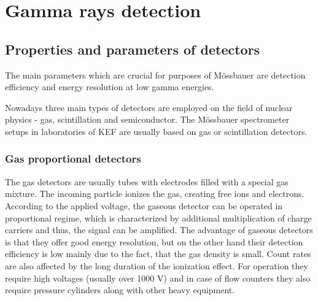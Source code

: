 
\chapter{Gamma rays detection}


\section{Properties and parameters of detectors}
The main parameters which are crucial for purposes of Mössbauer are detection efficiency and energy resolution at low gamma energies.
\par
Nowadays three main types of detectors are employed on the field of nuclear physics - gas, scintillation and semiconductor.
The Mössbauer spectrometer setups in laboratories of KEF are usually based on gas or scintillation detectors.


\subsection{Gas proportional detectors}
The gas detectors are usually tubes with electrodes filled with a special gas mixture. The incoming particle ionizes the gas, creating free ions and electrons.  According to the applied voltage, the gaseous detector can be operated in proportional regime, which is characterized by additional multiplication of charge carriers and thus, the signal can be amplified. The advantage of gaseous detectors is that they offer good energy resolution, but on the other hand their detection efficiency is low mainly due to the fact, that the gas density is small. Count rates are also affected by the long duration of the ionization effect. For operation they require high voltages (usually over 1000 V) and in case of flow counters they also require pressure cylinders along with other heavy equipment. 

% 



